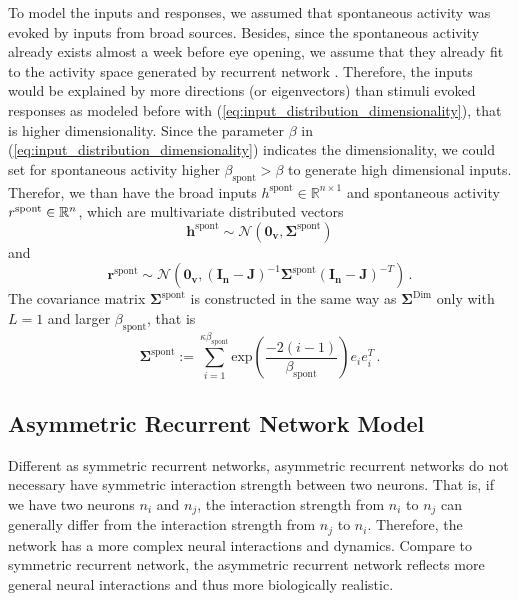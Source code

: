\documentclass[11pt]{article}
\begin{document}
	To model the inputs and responses, we assumed that spontaneous activity was evoked by inputs from broad sources. Besides, since the spontaneous activity already exists almost a week before eye opening, we assume that they already fit to the activity space generated by recurrent network \cite{tragenap2023nature}. Therefore, the inputs would be explained by more directions (or eigenvectors) than stimuli evoked responses as modeled before with (\ref{eq:input_distribution_dimensionality}), that is higher dimensionality. Since the parameter $\beta$ in (\ref{eq:input_distribution_dimensionality}) indicates the dimensionality, we could set for spontaneous activity higher $\beta_{\text{spont}} > \beta$ to generate high dimensional inputs. 
	Therefor, we than have the broad inputs $h^{\text{spont}} \in \mathbb{R}^{n \times 1}$ and spontaneous activity $r^{\text{spont}} \in \mathbb{R}^{n \time 1}$, which are multivariate distributed vectors 
		\begin{equation}
			\mathbf{h}^{\text{spont}} \sim \mathbf{\mathcal{N}}(\mathbf{0_v}, \mathbf{\Sigma}^{\text{spont}})
		\end{equation}
	and 
		\begin{equation}
			\mathbf{r}^{\text{spont}} \sim \mathbf{\mathcal{N}}\left( \mathbf{0_v}, (\mathbf{I_n} - \mathbf{J})^{-1} \mathbf{\Sigma}^{\text{spont}}(\mathbf{I_n} - \mathbf{J})^{-T}\right) \, .
		\end{equation}
	The covariance matrix $\mathbf{\Sigma}^{\text{spont}}$ is constructed in the same way as $\mathbf{\Sigma}^{\text{Dim}}$ only with $L=1$ and larger $\beta_{\text{spont}}$, that is
		\begin{equation} \label{eq:Sigma_spont}
			\mathbf{\Sigma}^{\text{spont}} := \sum_{i=1}^{\kappa\beta_{\text{spont}}} \text{exp}\left(\frac{-2(i-1)}{\beta_{\text{spont}}}\right) e_i e_i^T \, .
		\end{equation}
	
	\clearpage
	\subsection{Asymmetric Recurrent Network Model}
	Different as symmetric recurrent networks, asymmetric recurrent networks do not necessary have symmetric interaction strength between two neurons. That is, if we have two neurons $n_i$ and $n_j$, the interaction strength from $n_i$ to $n_j$ can generally differ from the interaction strength from $n_j$ to $n_i$. Therefore, the network has a more complex neural interactions and dynamics. Compare to symmetric recurrent network, the asymmetric recurrent network reflects more general neural interactions and thus more biologically realistic. 
	
\end{document}
